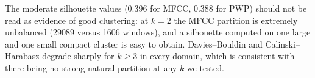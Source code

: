 The moderate silhouette values (\num{0.396} for MFCC, \num{0.388} for PWP) should
not be read as evidence of good clustering: at $k=2$ the MFCC partition is
extremely unbalanced (\num{29089} versus \num{1606} windows), and a silhouette
computed on one large and one small compact cluster is easy to obtain. Davies--Bouldin
and Calinski--Harabasz degrade sharply for $k \geq 3$ in every domain, which is
consistent with there being no strong natural partition at any $k$ we tested.
